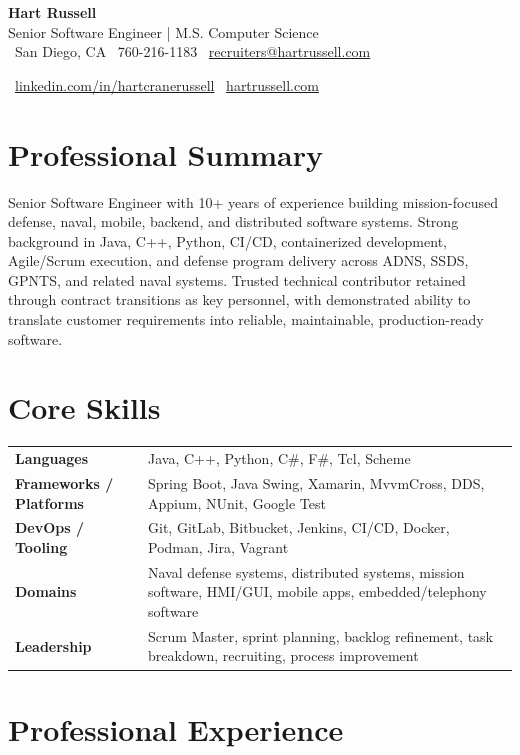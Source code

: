\documentclass[10pt,letterpaper]{article}
\newcommand{\resumeHeader}[5]{
  {\Huge \textbf{#1}} \\[3pt]
  {\large \color{accent} #2} \\[7pt]
  \small
  \faMapMarker* \ #3 \quad
  \faPhone \ #4 \quad
  \faEnvelope \ \href{mailto:#5}{#5}
}
\newcommand{\resumeLinks}[2]{
  \small
  \faLinkedin \ \href{#1}{linkedin.com/in/hartcranerussell}
  \quad
  \faGlobe \ \href{#2}{hartrussell.com}
}
\begin{document}
\color{textgray}

\resumeHeader
  {Hart Russell}
  {Senior Software Engineer \;|\; M.S. Computer Science}
  {San Diego, CA}
  {760-216-1183}
  {recruiters@hartrussell.com}

\vspace{3pt}
\resumeLinks
  {https://www.linkedin.com/in/hartcranerussell}
  {https://hartrussell.com/}

\vspace{7pt}

\section*{Professional Summary}
Senior Software Engineer with 10+ years of experience building mission-focused defense, naval, mobile, backend, and distributed software systems. Strong background in Java, C++, Python, CI/CD, containerized development, Agile/Scrum execution, and defense program delivery across ADNS, SSDS, GPNTS, and related naval systems. Trusted technical contributor retained through contract transitions as key personnel, with demonstrated ability to translate customer requirements into reliable, maintainable, production-ready software.

\section*{Core Skills}
\begin{tabularx}{\textwidth}{@{} l X @{}}
\textbf{Languages} & Java, C++, Python, C\#, F\#, Tcl, Scheme \\
\textbf{Frameworks / Platforms} & Spring Boot, Java Swing, Xamarin, MvvmCross, DDS, Appium, NUnit, Google Test \\
\textbf{DevOps / Tooling} & Git, GitLab, Bitbucket, Jenkins, CI/CD, Docker, Podman, Jira, Vagrant \\
\textbf{Domains} & Naval defense systems, distributed systems, mission software, HMI/GUI, mobile apps, embedded/telephony software \\
\textbf{Leadership} & Scrum Master, sprint planning, backlog refinement, task breakdown, recruiting, process improvement \\
\end{tabularx}

\section*{Professional Experience}
\end{document}
